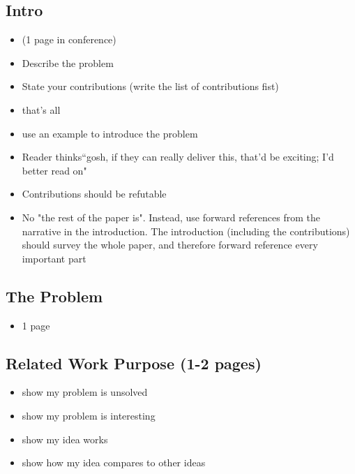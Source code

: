 \subsection{Intro}
\begin{itemize}
\item (1 page in conference)
\item Describe the problem
\item State your contributions (write the list of contributions fist)
\item that's all
\item use an example to introduce the problem
\item Reader thinks``gosh, if they can really deliver this, that'd be exciting; I’d better read on" \cite{jones2013how}
\item Contributions should be refutable
\item No "the rest of the paper is". Instead, use forward references from the narrative in the introduction. The introduction (including the contributions) should survey the whole paper, and therefore forward reference every important part
\end{itemize}

\subsection{The Problem}
\begin{itemize}
\item 1 page
\end{itemize}

\subsection{Related Work Purpose (1-2 pages)}
\begin{itemize}
\item show my problem is unsolved
\item show my problem is interesting
\item show my idea works
\item show how my idea compares to other ideas
\end{itemize}

